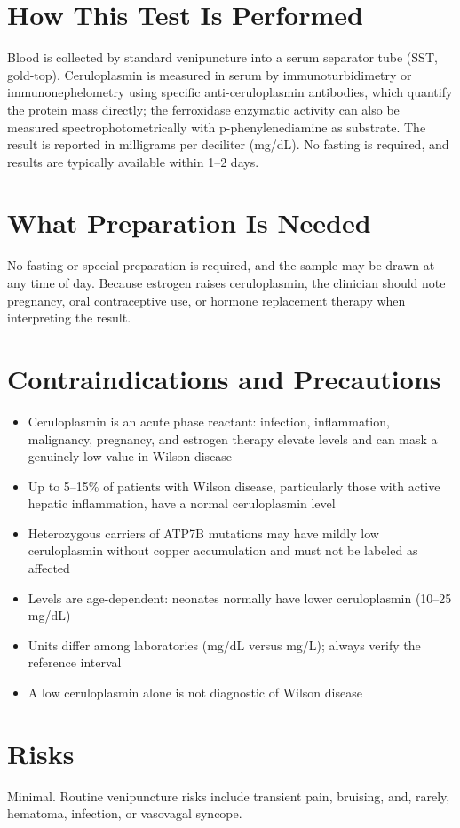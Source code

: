 \section*{How This Test Is Performed}
Blood is collected by standard venipuncture into a serum separator tube (SST, gold-top). Ceruloplasmin is measured in serum by immunoturbidimetry or immunonephelometry using specific anti-ceruloplasmin antibodies, which quantify the protein mass directly; the ferroxidase enzymatic activity can also be measured spectrophotometrically with p-phenylenediamine as substrate. The result is reported in milligrams per deciliter (mg/dL). No fasting is required, and results are typically available within 1--2 days.
\section*{What Preparation Is Needed}
No fasting or special preparation is required, and the sample may be drawn at any time of day. Because estrogen raises ceruloplasmin, the clinician should note pregnancy, oral contraceptive use, or hormone replacement therapy when interpreting the result.
\section*{Contraindications and Precautions}
\begin{itemize}
  \item Ceruloplasmin is an acute phase reactant: infection, inflammation, malignancy, pregnancy, and estrogen therapy elevate levels and can mask a genuinely low value in Wilson disease
  \item Up to 5--15\% of patients with Wilson disease, particularly those with active hepatic inflammation, have a normal ceruloplasmin level
  \item Heterozygous carriers of ATP7B mutations may have mildly low ceruloplasmin without copper accumulation and must not be labeled as affected
  \item Levels are age-dependent: neonates normally have lower ceruloplasmin (10--25 mg/dL)
  \item Units differ among laboratories (mg/dL versus mg/L); always verify the reference interval
  \item A low ceruloplasmin alone is not diagnostic of Wilson disease
\end{itemize}
\section*{Risks}
Minimal. Routine venipuncture risks include transient pain, bruising, and, rarely, hematoma, infection, or vasovagal syncope.
